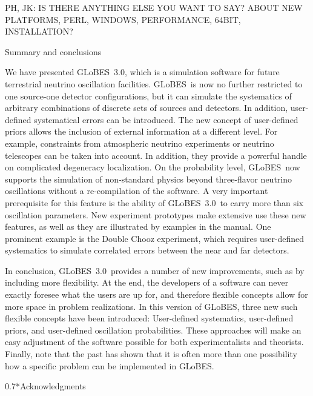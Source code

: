 \documentclass[12pt,a4paper]{article}
\makeatletter
\renewcommand{\section}{\@startsection{section}{1}{0em}{-\baselineskip}%
{\baselineskip}{\normalfont\large\bfseries}}
\renewcommand{\subsection}%
{\@startsection{subsection}{2}{0em}{-0.7\baselineskip}%
{0.7\baselineskip}{\normalfont\bfseries}}
\newcommand{\GLOBES}{{\sf GLoBES}}
\newcommand{\GLOBESN}{{\sf GLoBES~3.0}}
\makeatother
\begin{document}
PH, JK: IS THERE ANYTHING ELSE YOU WANT TO SAY? ABOUT NEW PLATFORMS,
PERL, WINDOWS, PERFORMANCE, 64BIT, INSTALLATION?

\section{Summary and conclusions}

We have presented \GLOBESN , which is a simulation software for 
future terrestrial neutrino oscillation facilities. \GLOBES\ is now no further
restricted to one source-one detector configurations, but it can simulate
the systematics of arbitrary combinations of discrete sets of sources and
detectors. In addition, user-defined systematical errors can be introduced.
The new concept of user-defined priors allows the inclusion of external
information at a different level. For example, constraints from atmospheric
neutrino experiments or neutrino telescopes can be taken into account. In addition,
they provide a powerful handle on complicated degeneracy localization.
On the probability level, \GLOBES\ now supports the simulation of non-standard
physics beyond three-flavor neutrino oscillations without a re-compilation of
the software. A very important prerequisite for this feature is the ability
of \GLOBESN\ to carry more than six oscillation parameters. New experiment
prototypes make extensive use these new features, as well as they are illustrated by
examples in the manual. One prominent example is the Double Chooz experiment,
which requires user-defined systematics to simulate correlated errors between
the near and far detectors.

In conclusion, \GLOBESN\ provides a number of new improvements, such as by
 including more flexibility. At the end, the developers of a software can never
exactly foresee what the users are up for, and therefore flexible concepts
allow for more space in problem realizations. In this version of \GLOBES ,
three new such flexible concepts have been introduced: User-defined systematics,
user-defined priors, and user-defined oscillation probabilities. These approaches
will make an easy adjustment of the software possible for both experimentalists and theorists.
Finally, note that the past has shown that it is often more than one possibility 
how a specific problem can be implemented in \GLOBES .

\subsection*{Acknowledgments}
\end{document}
